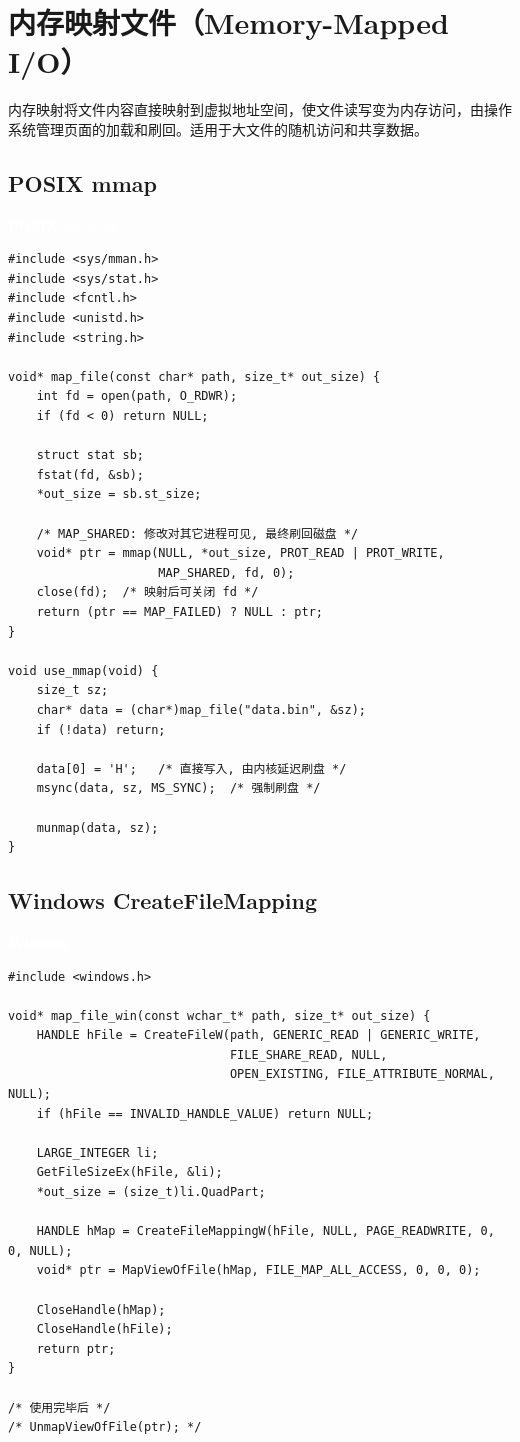 \documentclass[12pt,a4paper,fontset=fandol]{ctexbook}
\newcommand{\posixlabel}{%
  \noindent\begin{tcolorbox}[sharp corners,colback=posixheadbg,colframe=posixheadbg,
    left=6pt,right=6pt,top=2pt,bottom=2pt,boxrule=0pt]
  \textcolor{white}{\small\bfseries\sffamily POSIX Sockets}\end{tcolorbox}%
}
\newcommand{\winlabel}{%
  \noindent\begin{tcolorbox}[sharp corners,colback=winheadbg,colframe=winheadbg,
    left=6pt,right=6pt,top=2pt,bottom=2pt,boxrule=0pt]
  \textcolor{white}{\small\bfseries\sffamily Winsock}\end{tcolorbox}%
}
\begin{document}
\section{内存映射文件（Memory-Mapped I/O）}

内存映射将文件内容直接映射到虚拟地址空间，使文件读写变为内存访问，由操作系统管理页面的加载和刷回。适用于大文件的随机访问和共享数据。

\subsection{POSIX mmap}

\posixlabel
\begin{lstlisting}[style=cstyle]
#include <sys/mman.h>
#include <sys/stat.h>
#include <fcntl.h>
#include <unistd.h>
#include <string.h>

void* map_file(const char* path, size_t* out_size) {
    int fd = open(path, O_RDWR);
    if (fd < 0) return NULL;

    struct stat sb;
    fstat(fd, &sb);
    *out_size = sb.st_size;

    /* MAP_SHARED: 修改对其它进程可见, 最终刷回磁盘 */
    void* ptr = mmap(NULL, *out_size, PROT_READ | PROT_WRITE,
                     MAP_SHARED, fd, 0);
    close(fd);  /* 映射后可关闭 fd */
    return (ptr == MAP_FAILED) ? NULL : ptr;
}

void use_mmap(void) {
    size_t sz;
    char* data = (char*)map_file("data.bin", &sz);
    if (!data) return;

    data[0] = 'H';   /* 直接写入, 由内核延迟刷盘 */
    msync(data, sz, MS_SYNC);  /* 强制刷盘 */

    munmap(data, sz);
}
\end{lstlisting}

\subsection{Windows CreateFileMapping}

\winlabel
\begin{lstlisting}[style=cstyle]
#include <windows.h>

void* map_file_win(const wchar_t* path, size_t* out_size) {
    HANDLE hFile = CreateFileW(path, GENERIC_READ | GENERIC_WRITE,
                               FILE_SHARE_READ, NULL,
                               OPEN_EXISTING, FILE_ATTRIBUTE_NORMAL, NULL);
    if (hFile == INVALID_HANDLE_VALUE) return NULL;

    LARGE_INTEGER li;
    GetFileSizeEx(hFile, &li);
    *out_size = (size_t)li.QuadPart;

    HANDLE hMap = CreateFileMappingW(hFile, NULL, PAGE_READWRITE, 0, 0, NULL);
    void* ptr = MapViewOfFile(hMap, FILE_MAP_ALL_ACCESS, 0, 0, 0);

    CloseHandle(hMap);
    CloseHandle(hFile);
    return ptr;
}

/* 使用完毕后 */
/* UnmapViewOfFile(ptr); */
\end{lstlisting}
\end{document}
